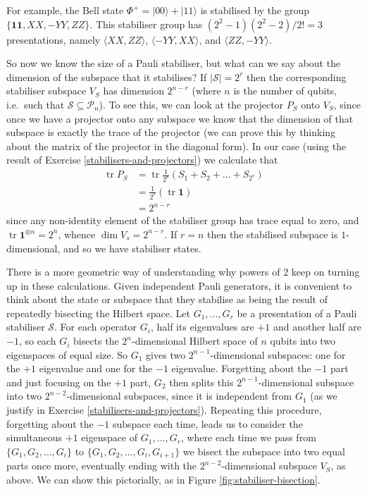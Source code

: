 \documentclass[fleqn,a4paper]{article}
\theoremstyle{definition}
\theoremstyle{definition}
\theoremstyle{definition}
\theoremstyle{definition}
\theoremstyle{remark}
\begin{document}
For example, the Bell state \(\Phi^+=|00\rangle+|11\rangle\) is stabilised by the group \(\{\mathbf{1}\mathbf{1},XX,-YY,ZZ\}\).
This stabiliser group has \((2^2-1)(2^2-2)/2!=3\) presentations, namely \(\langle XX,ZZ\rangle\), \(\langle -YY,XX\rangle\), and \(\langle ZZ,-YY\rangle\).

So now we know the size of a Pauli stabiliser, but what can we say about the dimension of the subspace that it stabilises?
If \(|\mathcal{S}|=2^r\) then the corresponding stabiliser subspace \(V_S\) has dimension \(2^{n-r}\) (where \(n\) is the number of qubits, i.e.~such that \(\mathcal{S}\subseteq\mathcal{P}_n\)).
To see this, we can look at the projector \(P_S\) onto \(V_S\), since once we have a projector onto any subspace we know that the dimension of that subspace is exactly the trace of the projector (we can prove this by thinking about the matrix of the projector in the diagonal form).
In our case (using the result of Exercise \ref{stabilisers-and-projectors}) we calculate that
\[
  \begin{aligned}
    \operatorname{tr}P_S
    &= \operatorname{tr}\frac{1}{2^r}(S_1+S_2+\ldots+S_{2^r})
  \\&= \frac{1}{2^r}(\operatorname{tr}\mathbf{1})
  \\&= 2^{n-r}
  \end{aligned}
\]
since any non-identity element of the stabiliser group has trace equal to zero, and \(\operatorname{tr}\mathbf{1}^{\otimes n}=2^n\), whence \(\dim V_s=2^{n-r}\).
If \(r=n\) then the stabilised subspace is \(1\)-dimensional, and so we have stabiliser states.

There is a more geometric way of understanding why powers of 2 keep on turning up in these calculations.
Given independent Pauli generators, it is convenient to think about the state or subspace that they stabilise as being the result of repeatedly bisecting the Hilbert space.
Let \(G_1,\ldots,G_r\) be a presentation of a Pauli stabiliser \(\mathcal{S}\).
For each operator \(G_i\), half its eigenvalues are \(+1\) and another half are \(-1\), so each \(G_i\) bisects the \(2^n\)-dimensional Hilbert space of \(n\) qubits into two eigenspaces of equal size.
So \(G_1\) gives two \(2^{n-1}\)-dimensional subspaces: one for the \(+1\) eigenvalue and one for the \(-1\) eigenvalue.
Forgetting about the \(-1\) part and just focusing on the \(+1\) part, \(G_2\) then splits this \(2^{n-1}\)-dimensional subspace into two \(2^{n-2}\)-dimensional subspaces, since it is independent from \(G_1\) (as we justify in Exercise \ref{stabilisers-and-projectors}).
Repeating this procedure, forgetting about the \(-1\) subspace each time, leads us to consider the simultaneous \(+1\) eigenspace of \(G_1,\ldots,G_r\), where each time we pass from \(\{G_1,G_2,\ldots,G_i\}\) to \(\{G_1,G_2,\ldots,G_i,G_{i+1}\}\) we bisect the subspace into two equal parts once more, eventually ending with the \(2^{n-2}\)-dimensional subspace \(V_S\), as above.
We can show this pictorially, as in Figure \ref{fig:stabiliser-bisection}.
\end{document}
